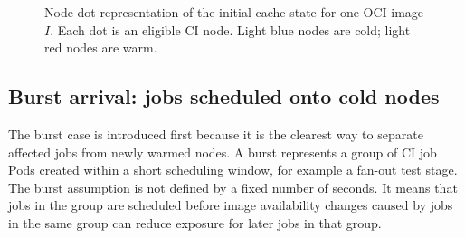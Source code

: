 \documentclass[11pt,a4paper]{article}
\begin{document}
\begin{figure}[H]
\centering
{}
\caption{Node-dot representation of the initial cache state for one OCI image \(I\). Each dot is an eligible CI node. Light blue nodes are cold; light red nodes are warm.}
\label{fig:nodedots-initial}
\end{figure}

\subsection{Burst arrival: jobs scheduled onto cold nodes}

The burst case is introduced first because it is the clearest way to separate affected jobs from newly warmed nodes. A burst represents a group of CI job Pods created within a short scheduling window, for example a fan-out test stage. The burst assumption is not defined by a fixed number of seconds. It means that jobs in the group are scheduled before image availability changes caused by jobs in the same group can reduce exposure for later jobs in that group.
\end{document}
